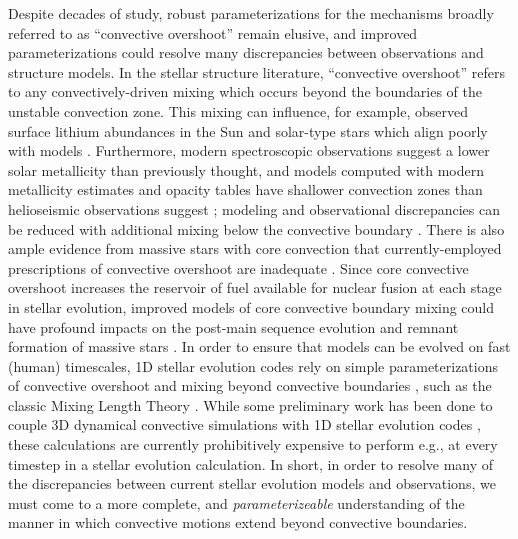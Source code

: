\documentclass{aastex631}
\begin{document}
Despite decades of study, robust parameterizations for the mechanisms broadly referred to as ``convective overshoot'' remain elusive, and improved parameterizations could resolve many discrepancies between observations and structure models.
In the stellar structure literature, ``convective overshoot'' refers to any convectively-driven mixing which occurs beyond the boundaries of the unstable convection zone.
This mixing can influence, for example, observed surface lithium abundances in the Sun and solar-type stars which align poorly with models \citep{pinsonneault1997, carlos_etal_2019, dumont_etal_2021}.
Furthermore, modern spectroscopic observations suggest a lower solar metallicity than previously thought, and models computed with modern metallicity estimates and opacity tables have shallower convection zones than helioseismic observations suggest \citep{basu_antia_2004, bahcall_etal_2005, vinyoles_etal_2017, asplund_etal_2021}; modeling and observational discrepancies can be reduced with additional mixing below the convective boundary \citep{christensen-dalsgaard_etal_2011}.
There is also ample evidence from massive stars with core convection that currently-employed prescriptions of convective overshoot are inadequate \citep{claret_torres_2018, jermyn_etal_2018, viani_basu_2020, martinet_etal_2021, pedersen_etal_2021}.
Since core convective overshoot increases the reservoir of fuel available for nuclear fusion at each stage in stellar evolution, improved models of core convective boundary mixing could have profound impacts on the post-main sequence evolution and remnant formation of massive stars \citep{farmer_etal_2019, higgins_vink_2020}.
In order to ensure that models can be evolved on fast (human) timescales, 1D stellar evolution codes rely on simple parameterizations of convective overshoot and mixing beyond convective boundaries \citep{shaviv_salpeter_1973, maeder1975, herwig2000, paxton_etal_2011, paxton_etal_2013, paxton_etal_2018, paxton_etal_2019}, such as the classic Mixing Length Theory \citep{bohm-vitense1958}.
While some preliminary work has been done to couple 3D dynamical convective simulations with 1D stellar evolution codes \citep{jorgensen_weiss_2019}, these calculations are currently prohibitively expensive to perform e.g., at every timestep in a stellar evolution calculation.
In short, in order to resolve many of the discrepancies between current stellar evolution models and observations, we must come to a more complete, and \emph{parameterizeable} understanding of the manner in which convective motions extend beyond convective boundaries.
\end{document}
